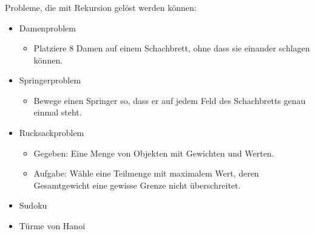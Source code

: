 \begin{frame}%
    \frametitle{\insertsubsection}
    \begin{block}{Probleme, die mit Rekursion gelöst werden können:}
    \begin{itemize}
        \item Damenproblem
        \begin{itemize}
            \item Platziere 8 Damen auf einem Schachbrett, ohne dass sie einander schlagen können.
        \end{itemize}
        \item Springerproblem
        \begin{itemize}
            \item Bewege einen Springer so, dass er auf jedem Feld des Schachbretts genau einmal steht.
        \end{itemize}
        \item Rucksackproblem
        \begin{itemize}
            \item Gegeben: Eine Menge von Objekten mit Gewichten und Werten.
            \item Aufgabe: Wähle eine Teilmenge mit maximalem Wert, deren Gesamtgewicht eine gewisse Grenze nicht überschreitet.	
        \end{itemize}
        \item Sudoku
        \item Türme von Hanoi
    \end{itemize}
    \end{block}
\end{frame}
